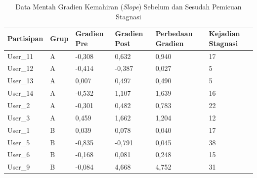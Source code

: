 \begin{table}[!ht]
    \centering
    \caption{Data Mentah Gradien Kemahiran (\textit{Slope}) Sebelum dan Sesudah Pemicuan Stagnasi}
    \label{tbl:slope_individu}
    \begin{tabular}{|p{2.0cm}|p{1.8cm}|p{1.8cm}|p{1.8cm}|p{2.2cm}|p{2.2cm}|}
        \hline
        \textbf{Partisipan} & \textbf{Grup} & \textbf{Gradien Pre} & \textbf{Gradien Post} & \textbf{Perbedaan Gradien} & \textbf{Kejadian Stagnasi} \\
        \hline
        \hline
        User\_11 & A & -0,308 & 0,632 & 0,940 & 17 \\
        \hline
        User\_12 & A & -0,414 & -0,387 & 0,027 & 5 \\
        \hline
        User\_13 & A & 0,007 & 0,497 & 0,490 & 5 \\
        \hline
        User\_14 & A & -0,532 & 1,107 & 1,639 & 16 \\
        \hline
        User\_2  & A & -0,301 & 0,482 & 0,783 & 22 \\
        \hline
        User\_3  & A & 0,459 & 1,662 & 1,204 & 12 \\
        \hline
        \hline
        User\_1  & B & 0,039 & 0,078 & 0,040 & 17 \\
        \hline
        User\_5  & B & -0,835 & -0,791 & 0,045 & 38 \\
        \hline
        User\_6  & B & -0,168 & 0,081 & 0,248 & 15 \\
        \hline
        User\_9  & B & -0,084 & 4,668 & 4,752 & 31 \\
        \hline
    \end{tabular}
\end{table}
